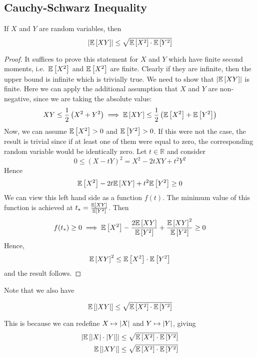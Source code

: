 \subsection{Cauchy-Schwarz Inequality}
\begin{theorem}
	If \(X\) and \(Y\) are random variables, then
	\[
		\abs{\mathbb{E}\left[{XY}\right]} \leq \sqrt{\mathbb{E}\left[{X^2}\right]\cdot\mathbb{E}\left[{Y^2}\right]}
	\]
\end{theorem}
\begin{proof}
	It suffices to prove this statement for \(X\) and \(Y\) which have finite second moments, i.e.\ \(\mathbb{E}\left[{X^2}\right]\) and \(\mathbb{E}\left[{X^2}\right]\) are finite.
	Clearly if they are infinite, then the upper bound is infinite which is trivially true.
	We need to show that \(\abs{\mathbb{E}\left[{XY}\right]}\) is finite.
	Here we can apply the additional assumption that \(X\) and \(Y\) are non-negative, since we are taking the absolute value:
	\[
		XY \leq \frac{1}{2}\left(X^2 + Y^2\right) \implies \mathbb{E}\left[{XY}\right] \leq \frac{1}{2}\left( \mathbb{E}\left[{X^2}\right] + \mathbb{E}\left[{Y^2}\right]  \right)
	\]
	Now, we can assume \(\mathbb{E}\left[{X^2}\right] > 0\) and \(\mathbb{E}\left[{Y^2}\right] > 0\).
	If this were not the case, the result is trivial since if at least one of them were equal to zero, the corresponding random variable would be identically zero.
	Let \(t \in \mathbb R\) and consider
	\[
		0 \leq (X - tY)^2 = X^2 - 2tXY + t^2Y^2
	\]
	Hence
	\[
		\mathbb{E}\left[{X^2}\right] - 2t\mathbb{E}\left[{XY}\right] + t^2\mathbb{E}\left[{Y^2}\right] \geq 0
	\]
	We can view this left hand side as a function \(f(t)\).
	The minimum value of this function is achieved at \(t_\ast = \frac{\mathbb{E}\left[{XY}\right]}{\mathbb{E}\left[{Y^2}\right]}\).
	Then
	\[
		f(t_\ast) \geq 0 \implies \mathbb{E}\left[{X^2}\right] - \frac{2\mathbb{E}\left[{XY}\right]}{\mathbb{E}\left[{Y^2}\right]} + \frac{\mathbb{E}\left[{XY}\right]^2}{\mathbb{E}\left[{Y^2}\right]} \geq 0
	\]
	Hence,
	\[
		\mathbb{E}\left[{XY}\right]^2 \leq \mathbb{E}\left[{X^2}\right]\cdot \mathbb{E}\left[{Y^2}\right]
	\]
	and the result follows.
\end{proof}

Note that we also have

\[
	\mathbb{E}\left[{\abs{XY}}\right] \leq \sqrt{\mathbb{E}\left[{X^2}\right]\cdot\mathbb{E}\left[{Y^2}\right]}
\]

This is because we can redefine \(X \mapsto \abs{X}\) and \(Y \mapsto \abs{Y}\), giving
\begin{align*}
	\abs{\mathbb{E}\left[{\abs{X} \cdot \abs{Y}}\right]} & \leq \sqrt{\mathbb{E}\left[{X^2}\right]\cdot\mathbb{E}\left[{Y^2}\right]} \\
	\mathbb{E}\left[{\abs{XY}}\right]                    & \leq \sqrt{\mathbb{E}\left[{X^2}\right]\cdot\mathbb{E}\left[{Y^2}\right]}
\end{align*}
